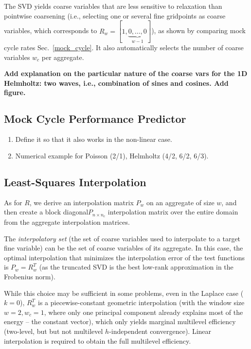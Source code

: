 \documentclass{article}
\begin{document}
The SVD yields coarse variables that are less sensitive to relaxation than pointwise coarsening (i.e., selecting one or several fine gridpoints as coarse variables, which corresponds to $R_w = [1,\underbrace{0,\dots,0}_{w-1}]$), as shown by comparing mock cycle rates Sec.~\ref{mock_cycle}. It also automatically selects the number of coarse variables $w_c$ per aggregate.

{\bf Add explanation on the particular nature of the coarse vars for the 1D Helmholtz: two waves, i.e., combination of sines and cosines. Add figure.}

\subsection{Mock Cycle Performance Predictor}
\label{sec:mock_cycle}
{\bf
\begin{enumerate}
\item Define it so that it also works in the non-linear case.
\item Numerical example for Poisson (2/1), Helmholtz (4/2, 6/2, 6/3).
\end{enumerate}
}

\subsection{Least-Squares Interpolation}
\label{sec:interpolation}
As for $R$, we derive an interpolation matrix $P_w$ on an aggregate of size $w$, and then create a block diagonal$P_{n \times n_c}$ interpolation matrix over the entire domain from the aggregate interpolation matrices.

The \emph{interpolatory set} (the set of coarse variables used to interpolate to a target fine variable) can be the set of coarse variables of its aggregate. In this case, the optimal interpolation that minimizes the interpolation error of the test functions is $P_w = R_w^T$ (as the truncated SVD is the best low-rank approximation in the Frobenius norm).

While this choice may be sufficient in some problems, even in the Laplace case ($k=0$), $R_w^T$ is a piecewise-constant geometric interpolation (with the window size $w = 2, w_c = 1$, where only one principal component already explains most of the energy -- the constant vector), which only yields marginal multilevel efficiency (two-level, but but not multilevel $h$-independent convergence). Linear interpolation is required to obtain the full multilevel efficiency.
\end{document}
